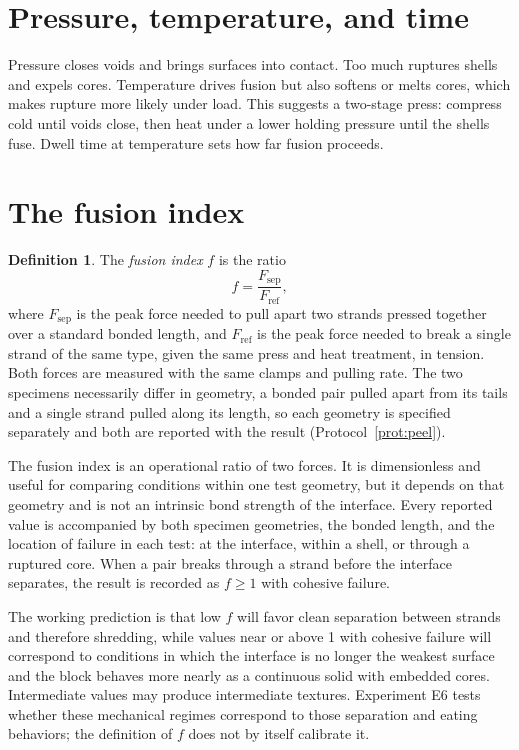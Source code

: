 \documentclass[11pt,openany]{book}
\theoremstyle{definition}
\newtheorem{definition}{Definition}[chapter]
\begin{document}
\section{Pressure, temperature, and time}

Pressure closes voids and brings surfaces into contact. Too much ruptures shells and expels cores. Temperature drives fusion but also softens or melts cores, which makes rupture more likely under load. This suggests a two-stage press: compress cold until voids close, then heat under a lower holding pressure until the shells fuse. Dwell time at temperature sets how far fusion proceeds.

\section{The fusion index}

\begin{definition}
The \emph{fusion index} $f$ is the ratio
\[
f = \frac{F_{\text{sep}}}{F_{\text{ref}}},
\]
where $F_{\text{sep}}$ is the peak force needed to pull apart two strands pressed together over a standard bonded length, and $F_{\text{ref}}$ is the peak force needed to break a single strand of the same type, given the same press and heat treatment, in tension. Both forces are measured with the same clamps and pulling rate. The two specimens necessarily differ in geometry, a bonded pair pulled apart from its tails and a single strand pulled along its length, so each geometry is specified separately and both are reported with the result (Protocol~\ref{prot:peel}).
\end{definition}

The fusion index is an operational ratio of two forces. It is dimensionless and useful for comparing conditions within one test geometry, but it depends on that geometry and is not an intrinsic bond strength of the interface. Every reported value is accompanied by both specimen geometries, the bonded length, and the location of failure in each test: at the interface, within a shell, or through a ruptured core. When a pair breaks through a strand before the interface separates, the result is recorded as $f \geq 1$ with cohesive failure.

The working prediction is that low $f$ will favor clean separation between strands and therefore shredding, while values near or above 1 with cohesive failure will correspond to conditions in which the interface is no longer the weakest surface and the block behaves more nearly as a continuous solid with embedded cores. Intermediate values may produce intermediate textures. Experiment E6 tests whether these mechanical regimes correspond to those separation and eating behaviors; the definition of $f$ does not by itself calibrate it.
\end{document}
